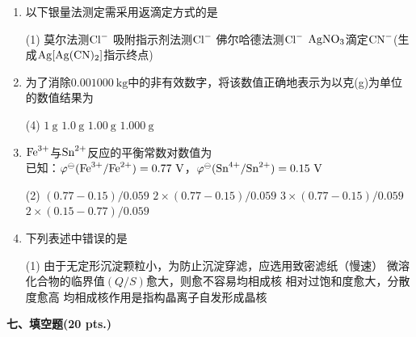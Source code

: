 \begin{enumerate}[label=\arabic*., itemsep=1.5ex]
    \item 以下银量法测定需采用返滴定方式的是
    \begin{tasks}(1)
        \task 莫尔法测$\ce{Cl-}$
        \task 吸附指示剂法测$\ce{Cl-}$
        \task 佛尔哈德法测$\ce{Cl-}$
        \task $\ce{AgNO3}$滴定$\ce{CN-}$(生成$\ce{Ag[Ag(CN)2]}$指示终点)
    \end{tasks}

    \item 为了消除$0.001000\ \mathrm{kg}$中的非有效数字，将该数值正确地表示为以克(g)为单位的数值结果为
    \begin{tasks}(4)
        \task $1\ \mathrm{g}$
        \task $1.0\ \mathrm{g}$
        \task $1.00\ \mathrm{g}$
        \task $1.000\ \mathrm{g}$
    \end{tasks}

    \item $\ce{Fe^{3+}}$与$\ce{Sn^{2+}}$反应的平衡常数对数值为
    \\
    已知：$\varphi^\ominus(\ce{Fe^{3+}/Fe^{2+}})=0.77\ \mathrm{V}$，$\varphi^\ominus(\ce{Sn^{4+}/Sn^{2+}})=0.15\ \mathrm{V}$
    \begin{tasks}(2)
        \task $(0.77-0.15)/0.059$
        \task $2\times(0.77-0.15)/0.059$
        \task $3\times(0.77-0.15)/0.059$
        \task $2\times(0.15-0.77)/0.059$
    \end{tasks}

    \item 下列表述中错误的是
    \begin{tasks}(1)
        \task 由于无定形沉淀颗粒小，为防止沉淀穿滤，应选用致密滤纸（慢速）
        \task 微溶化合物的临界值$(Q/S)$愈大，则愈不容易均相成核
        \task 相对过饱和度愈大，分散度愈高
        \task 均相成核作用是指构晶离子自发形成晶核
    \end{tasks}
\end{enumerate}

\vspace{0.5cm}
\noindent\textbf{七、填空题(20 pts.)}

